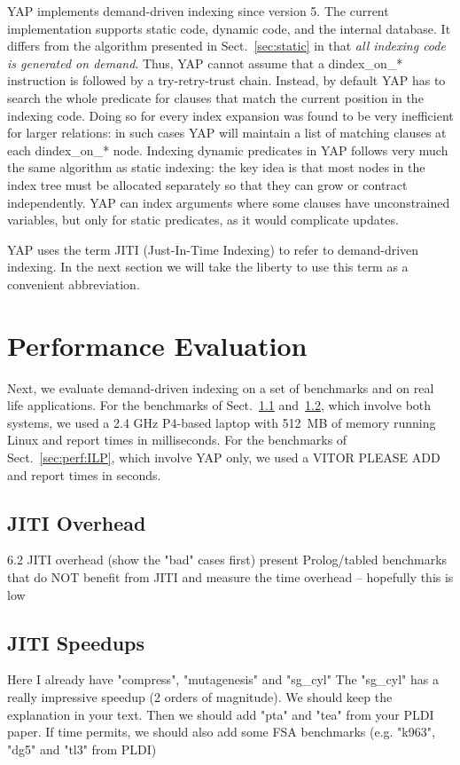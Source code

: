 \documentclass{llncs}
\newcommand{\instr}[1]{\textsf{#1}}
\newcommand{\TryRetryTrust}{\mbox{\instr{try-retry-trust}}\xspace}
\newcommand{\jitiSTAR}{\mbox{\instr{dindex\_on\_*}}\xspace}
\newcommand{\JITI}{demand-driven indexing\xspace}
\begin{document}
YAP implements \JITI since version 5. The current implementation
supports static code, dynamic code, and the internal database. It
differs from the algorithm presented in Sect.~\ref{sec:static} in that
\emph{all indexing code is generated on demand}. Thus, YAP cannot
assume that a \jitiSTAR instruction is followed by a \TryRetryTrust
chain. Instead, by default YAP has to search the whole predicate for
clauses that match the current position in the indexing code. Doing so
for every index expansion was found to be very inefficient for larger
relations: in such cases YAP will maintain a list of matching clauses
at each \jitiSTAR node. Indexing dynamic predicates in YAP follows
very much the same algorithm as static indexing: the key idea is that
most nodes in the index tree must be allocated separately so that they
can grow or contract independently. YAP can index arguments where some
clauses have unconstrained variables, but only for static predicates,
as it would complicate updates.

YAP uses the term JITI (Just-In-Time Indexing) to refer to \JITI. In
the next section we will take the liberty to use this term as a
convenient abbreviation.


\section{Performance Evaluation} \label{sec:perf}
Next, we evaluate \JITI on a set of benchmarks and on real life
applications. For the benchmarks of Sect.~\ref{sec:perf:overhead}
and~\ref{sec:perf:speedups}, which involve both systems, we used a 2.4
GHz P4-based laptop with 512~MB of memory running Linux and report
times in milliseconds. For the benchmarks of Sect.~\ref{sec:perf:ILP},
which involve YAP only, we used a 
%
VITOR PLEASE ADD
%
and report times in seconds.

\subsection{JITI Overhead} \label{sec:perf:overhead}
   6.2 JITI overhead (show the "bad" cases first)
       present Prolog/tabled benchmarks that do NOT benefit from JITI
       and measure the time overhead -- hopefully this is low

\subsection{JITI Speedups} \label{sec:perf:speedups}
       Here I already have "compress", "mutagenesis" and "sg\_cyl"
       The "sg\_cyl" has a really impressive speedup (2 orders of
       magnitude).  We should keep the explanation in your text.
       Then we should add "pta" and "tea" from your PLDI paper.
       If time permits, we should also add some FSA benchmarks
       (e.g. "k963", "dg5" and "tl3" from PLDI)
\end{document}

